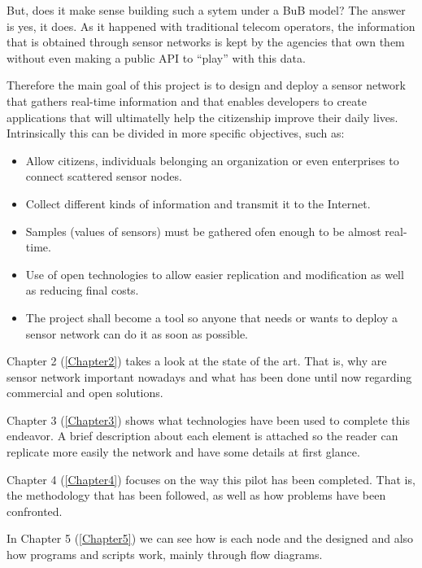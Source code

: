 But, does it make sense building such a sytem under a BuB model? The answer is yes, it does. As it happened with traditional telecom operators, the information that is obtained through sensor networks is kept by the agencies that own them without even making a public API to ``play'' with this data.

Therefore the main goal of this project is to design and deploy a sensor network that gathers real-time information and that enables developers to create applications that will ultimatelly help the citizenship improve their daily lives. Intrinsically this can be divided in more specific objectives, such as:

\begin{itemize}
    \item Allow citizens, individuals belonging an organization or even enterprises to connect scattered sensor nodes.
    \item Collect different kinds of information and transmit it to the Internet.
    \item Samples (values of sensors) must be gathered ofen enough to be almost real-time.
    \item Use of open technologies to allow easier replication and modification as well as reducing final costs.
    \item The project shall become a tool so anyone that needs or wants to deploy a sensor network can do it as soon as possible.
\end{itemize}

Chapter 2 (\ref{Chapter2}) takes a look at the state of the art. That is, why are sensor network important nowadays and what has been done until now regarding commercial and open solutions.

Chapter 3 (\ref{Chapter3}) shows what technologies have been used to complete this endeavor. A brief description about each element is attached so the reader can replicate more easily the network and have some details at first glance.

Chapter 4 (\ref{Chapter4}) focuses on the way this pilot has been completed. That is, the methodology that has been followed, as well as how problems have been confronted.

In Chapter 5 (\ref{Chapter5}) we can see how is each node and the designed and also how programs and scripts work, mainly through flow diagrams.
